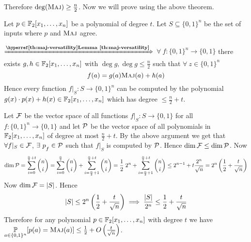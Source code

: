 Therefore $\deg(\textsc{Maj})\geq \frac{n}{2}$. Now we will prove  using the above theorem. \vspace*{2mm}

\begin{proof-of-lemma}
Let $p\in \mathbb{F}_2[x_1,\dots, x_n]$ be a polynomial of degree $t$. Let $S\subseteq \{0,1\}^n$ be the set of inputs where $p$ and $\textsc{Maj}$ agree. \parinf

$\xRightarrow{\textbf{\lmref{maj-versatility}}}$ $\forall\ f:\{0,1\}^n\to \{0,1\}$ there exists $g,h\in\mathbb{F}_2[x_1,\dots, x_n]$ with $\deg g, \deg g\leq \frac{n}2$ such that $\forall \  z\in\{0,1\}^n$ $$f(a)=g(a)\textsc{Maj}(a)+h(a)$$Hence every function $f|_S:S\to \{0,1\}^n$ can be computed by the polynomial $g(x)\cdot p(x)+h(x)\in \mathbb{F}_2[x_1,\dots, x_n]$ which has degree $\leq \frac{n}{2}+t$. \parinn

Let $\mathcal{F}$ be the vector space  of all functions $f|_S:S\to \{0,1\}$ for all $f:\{0,1\}^n\to \{0,1\}$ and let $\mathcal{P}$ be the vector space of all polynomials in $\mathbb{F}_2[x_1,\dots, x_n]$ of degree at most $\frac{n}{2}+t$. By the above argument we get that $\forall f|_S\in \mathcal{F}$, $\exists \ p\strut_f\in \mathcal{P}$ such that $f|_S$ is computed by $\mathcal{P}$. Hence $\dim\mathcal{F}\leq \dim\mathcal{P}$. Now $$\dim \mathcal{P}=\sum_{i=0}^{\frac{n}2+t}\binom{n}{i}=\sum_{i=0}^{\frac{n}2}\binom{n}{i}+\sum_{i=\frac{n}2+1}^{\frac{n}2+t}\binom{n}{i}=\frac12\; 2^n+\sum_{i=\frac{n}2+1}^{\frac{n}2+t}\binom{n}{i}\leq 2^{n-1}+t\frac{2^n}{\sqrt{n}}=2^n\left(\frac12+\frac{t}{\sqrt{n}}\right)$$Now $\dim \mathcal{F}=|S|$. Hence $$|S|\leq 2^n\left(\frac12+\frac{t}{\sqrt{n}}\right)\implies \frac{|S|}{2^n}\leq \frac12+\frac{t}{\sqrt{n}}$$Therefore for any polynomial $p\in \mathbb{F}_2[x_1,\dots, x_n]$ with degree $t$ we have $\underset{a\in\{0,1\}^n}{\mathbb{P}}[p(a)=\textsc{Maj}(a)]\leq \frac12+O\left(\frac{t}{\sqrt{n}}\right)$.
\end{proof-of-lemma}